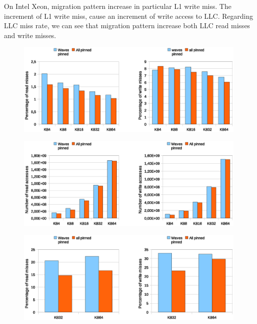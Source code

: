 On Intel Xeon, migration pattern increase in particular L1 write miss. The increment of L1 write miss, cause an increment of write 
access to LLC. Regarding LLC miss rate, we can see that migration pattern increase both LLC read misses and write misses. 
\newpage

\begin{figure}[htbp]
\centering
\includegraphics[width=\widefigure]{images/cpuaff/cpuaff_l1_load_store_i7.eps}
\caption{}
\label{fig:cpuaff_l1_load_xeon}
\end{figure}

\begin{figure}[htbp]
\centering
\includegraphics[width=\widefigure]{images/cpuaff/cpuaff_acc_l3_load_store_i7.eps}
\caption{}
\label{fig:cpuaff_acc_l2_load_store_xeon}
\end{figure}

\begin{figure}[]
\centering
\includegraphics[width=\widefigure]{images/cpuaff/cpuaff_l3_load_store_i7.eps}
\caption{}
\label{fig:cpuaff_l1_load_xeon}
\end{figure}
\newpage

